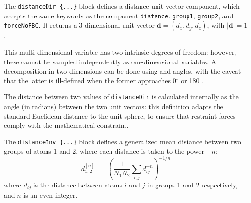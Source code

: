 
The \texttt{distanceDir~\{...\}} block defines
a distance unit vector component, which accepts the same keywords as
the component \texttt{distance}: \texttt{group1}, \texttt{group2}, and
\texttt{forceNoPBC}.  It returns a
3-dimensional unit vector $\mathbf{d} = (d_{x}, d_{y}, d_{z})$, with
$|\mathbf{d}| = 1$.

This multi-dimensional variable has two intrinsic degrees of freedom: however, these cannot be
sampled independently as one-dimensional variables.  A decomposition in two dimensions can be done
using  and  angles, with the
caveat that the latter is ill-defined when the former approaches 0$^\circ$ or 180$^\circ$.

The distance between two values of \texttt{distanceDir} is calculated internally as the angle (in
radians) between the two unit vectors: this definition adapts the standard Euclidean distance to the
unit sphere, to ensure that restraint forces comply with the mathematical constraint.


\begin{cvcoptions}
\item %
\item %
\item %
\end{cvcoptions}



The \texttt{distanceInv~\{...\}} block defines a generalized mean distance between two groups of atoms 1 and 2,
where each distance is taken to the power $-n$:
\begin{equation}
  \label{eq:distanceInv}
  d_{\mathrm{1,2}}^{[n]} \; = \;   \left(\frac{1}{N_{\mathrm{1}}N_{\mathrm{2}}}\sum_{i,j} d_{ij}^{-n} \right)^{-1/n}
\end{equation}
where $d_{ij}$ is the distance between atoms $i$ and $j$ in groups 1 and 2 respectively, and $n$ is an even integer.

